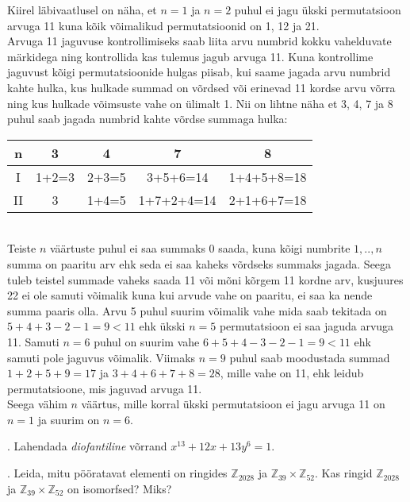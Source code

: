 \documentclass[a4paper, 10pt]{article}
\newcommand{\Z}{\mathbb{Z}}
\begin{document}
\bigskip
Kiirel läbivaatlusel on näha, et $n=1$ ja $n=2$ puhul ei jagu ükski permutatsioon arvuga 11 kuna kõik võimalikud permutatsioonid on 1, 12 ja 21.\\
Arvuga 11 jaguvuse kontrollimiseks saab liita arvu numbrid kokku vahelduvate märkidega ning kontrollida kas tulemus jagub arvuga 11. Kuna kontrollime jaguvust kõigi permutatsioonide hulgas piisab, kui saame jagada arvu numbrid kahte hulka, kus hulkade summad on võrdsed või erinevad 11 kordse arvu võrra ning kus hulkade võimsuste vahe on ülimalt 1. Nii on lihtne näha et 3, 4, 7 ja 8 puhul saab jagada numbrid kahte võrdse summaga hulka:\\
\begin{tabular}{c|c|c|c|c}
n&3&4&7&8\\
\hline
I&1+2=3&2+3=5&3+5+6=14&1+4+5+8=18\\
II&3&1+4=5&1+7+2+4=14&2+1+6+7=18
\end{tabular}\\
Teiste $n$ väärtuste puhul ei saa summaks 0 saada, kuna kõigi numbrite $1,..,n$ summa on paaritu arv ehk seda ei saa kaheks võrdseks summaks jagada. Seega tuleb teistel summade vaheks saada 11 või mõni kõrgem 11 kordne arv, kusjuures 22 ei ole samuti võimalik kuna kui arvude vahe on paaritu, ei saa ka nende summa paaris olla. Arvu 5 puhul suurim võimalik vahe mida saab tekitada on $5+4+3-2-1=9<11$ ehk ükski $n=5$ permutatsioon ei saa jaguda arvuga 11. Samuti $n=6$ puhul on suurim vahe $6+5+4-3-2-1=9<11$ ehk samuti pole jaguvus võimalik. Viimaks $n=9$ puhul saab moodustada summad $1+2+5+9=17$ ja $3+4+6+7+8=28$, mille vahe on 11, ehk leidub permutatsioone, mis jaguvad arvuga 11.\\
Seega vähim $n$ väärtus, mille korral ükski permutatsioon ei jagu arvuga 11 on $n=1$ ja suurim on $n=6$.
\bigskip

. Lahendada \emph{diofantiline} võrrand $x^{13}+12x+13y^6=1$.

\bigskip

. Leida, mitu pööratavat elementi on ringides $\Z_{2028}$ ja $\Z_{39}\times \Z_{52}$. Kas ringid $\Z_{2028}$ ja $\Z_{39}\times \Z_{52}$ on isomorfsed? Miks?
\end{document}
